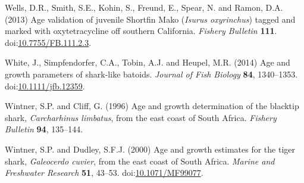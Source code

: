 \documentclass[]{article}
\begin{document}
\hypertarget{ref-wells_age_2013}{}
Wells, D.R., Smith, S.E., Kohin, S., Freund, E., Spear, N. and Ramon,
D.A. (2013) Age validation of juvenile Shortfin Mako (\emph{Isurus
oxyrinchus}) tagged and marked with oxytetracycline off southern
California. \emph{Fishery Bulletin} \textbf{111}.
doi:\href{https://doi.org/10.7755/FB.111.2.3}{10.7755/FB.111.2.3}.

\hypertarget{ref-white_age_2014}{}
White, J., Simpfendorfer, C.A., Tobin, A.J. and Heupel, M.R. (2014) Age
and growth parameters of shark-like batoids. \emph{Journal of Fish
Biology} \textbf{84}, 1340--1353.
doi:\href{https://doi.org/10.1111/jfb.12359}{10.1111/jfb.12359}.

\hypertarget{ref-wintner_age_1996}{}
Wintner, S.P. and Cliff, G. (1996) Age and growth determination of the
blacktip shark, \emph{Carcharhinus limbatus}, from the east coast of
South Africa. \emph{Fishery Bulletin} \textbf{94}, 135--144.

\hypertarget{ref-wintner_age_2000}{}
Wintner, S.P. and Dudley, S.F.J. (2000) Age and growth estimates for the
tiger shark, \emph{Galeocerdo cuvier}, from the east coast of South
Africa. \emph{Marine and Freshwater Research} \textbf{51}, 43--53.
doi:\href{https://doi.org/10.1071/MF99077}{10.1071/MF99077}.
\end{document}
